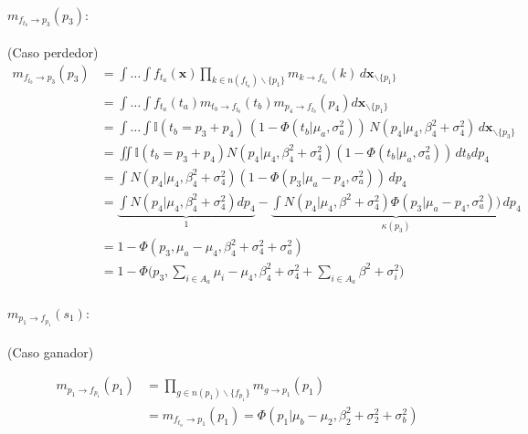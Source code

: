 \documentclass[11pt,twoside, spanish]{report} %
\begin{document}
\paragraph{$m_{f_{t_b} \rightarrow p_3}(p_3):$} (Caso perdedor)
\begin{equation}
	\begin{split}
		m_{f_{t_b} \rightarrow p_3}(p_3)&= \int \dots \int f_{t_a}(\textbf{x}) \prod_{k \in n(f_{t_a}) \backslash \{p_1\} } m_{k \rightarrow f_{t_a}}(k) \, d\textbf{x}_{\backslash \{p_1\} }  \\
		&= \int \dots \int f_{t_a}(t_a) m_{t_b\rightarrow f_{t_b}}(t_b) m_{p_4 \rightarrow f_{t_b}}(p_4)d\textbf{x}_{\backslash \{p_1\} }  \\
		&= \int \dots \int \mathbb{I}( t_b = p_3 + p_4) \, (1-\Phi (t_b| \mu_a , \sigma_a^2 )) \, N(p_4| \mu_4, \beta_4^2 + \sigma_4^2 ) \, d\textbf{x}_{\backslash \{p_3\} }\\
		&= \iint \mathbb{I}( t_b = p_3 + p_4) N(p_4| \mu_4, \beta_4^2 + \sigma_4^2 )  (1 - \Phi (t_b| \mu_a , \sigma_a^2) )\, dt_b dp_4 \\
		&=\int N(p_4| \mu_4, \beta_4^2 + \sigma_4^2 )  (1 - \Phi (p_3 | \mu_a - p_4 , \sigma_a^2 ) ) \,  dp_4 \\
		& =  \underbrace{\int N(p_4| \mu_4, \beta_4^2 + \sigma_4^2 )dp_4}_{1}  -  \underbrace{\int N(p_4| \mu_4, \beta^2 + \sigma_4^2 ) \Phi (p_3 | \mu_a - p_4 , \sigma_a^2 ) ) \, dp_4}_{\kappa(p_3)} \\
		& = 1 - \Phi(p_3, \mu_a  - \mu_4, \beta_4^2 + \sigma_4^2 + \sigma_a^2)\\[0.1cm]
		&=1 - \Phi\Big(p_3, \sum_{i \in A_a} \mu_i  - \mu_4, \beta_4^2 + \sigma_4^2 + \sum_{i \in A_a} \beta^2 + \sigma_i^2  \Big)
	\end{split}
\end{equation}


\paragraph{$m_{p_1 \rightarrow f_{p_1}}(s_1):$} (Caso ganador)

\begin{equation}
	\begin{split}
		m_{p_1 \rightarrow f_{p_1}}(p_1) &= \prod_{g \in n(p_1) \backslash  \{f_{p_1} \}} m_{g \rightarrow p_1} (p_1) \\
		&=m_{f_{t_a} \rightarrow p_1}(p_1) =  \Phi(p_1| \mu_b - \mu_2, \beta_2^2 + \sigma_2^2 + \sigma_b^2)
	\end{split}
\end{equation}
\end{document}
